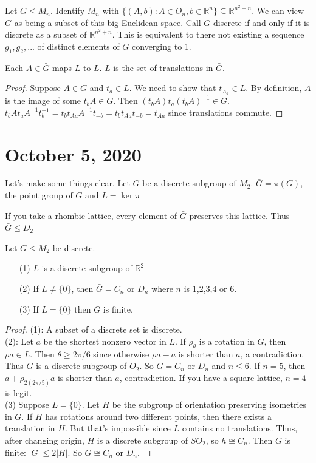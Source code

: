 \documentclass{article}
\newcommand{\R}{\mathbb{R}}
\begin{document}
\begin{definition}
Let $G\leq M_n$. Identify $M_n$ with $\{(A,b):A\in O_n, b\in\R^n\}\subseteq\R^{n^2+n}$. We can view $G$ as being a subset of this big Euclidean space. Call $G$ discrete if and only if it is discrete as a subset of $\R^{n^2+n}$. This is equivalent to there not existing a sequence $g_1,g_2,...$ of distinct elements of $G$ converging to 1.
\end{definition}
\begin{proposition}
Each $A\in\bar{G}$ maps $L$ to $L$. $L$ is the set of translations in $\bar{G}$.
\end{proposition}
\begin{proof}
Suppose $A\in\bar{G}$ and $t_a\in L$. We need to show that $t_{A_a}\in L$. By definition, $A$ is the image of some $t_bA\in G$. Then $(t_bA)t_a(t_bA)^{-1}\in G$. $t_bAt_aA^{-1}t^{-1}_b=t_bt_{Aa}A^{-1}t_{-b}=t_bt_{Aa}t_{-b}=t_{Aa}$ since translations commute.
\end{proof}
\section{October 5, 2020}
Let's make some things clear. Let $G$ be a discrete subgroup of $M_2$. $\bar{G}=\pi(G)$, the point group of $G$ and $L=\ker\pi$
\begin{example}
If you take a rhombic lattice, every element of $\bar{G}$ preserves this lattice. Thus $\bar{G}\leq D_2$
\end{example}
\begin{theorem}
Let $G\leq M_2$ be discrete.
\begin{enumerate}
    \item[(1)] $L$ is a discrete subgroup of $\R^2$
    \item[(2)] If $L\neq \{0\}$, then $\bar{G}=C_n$ or $D_n$ where $n$ is 1,2,3,4 or 6.
    \item[(3)] If $L=\{0\}$ then $G$ is finite.
\end{enumerate}
\end{theorem}
\begin{proof}
(1): A subset of a discrete set is discrete. \\
(2): Let $a$ be the shortest nonzero vector in $L$. If $\rho_\theta$ is a rotation in $\bar{G}$, then $\rho a\in L$. Then $\theta\geq 2\pi/6$ since otherwise $\rho a-a$ is shorter than $a$, a contradiction. Thus $\bar{G}$ is a discrete subgroup of $O_2$. So $\bar{G}=C_n$ or $D_n$ and $n\leq 6$. If $n=5$, then $a+\rho_{2(2\pi/5)}a$ is shorter than $a$, contradiction. If you have a square lattice, $n=4$ is legit. \\
(3) Suppose $L=\{0\}$. Let $H$ be the subgroup of orientation preserving isometries in $G$. If $H$ has rotations around two different points, then there exists a translation in $H$. But that's impossible since $L$ contains no translations. Thus, after changing origin, $H$ is a discrete subgroup of $SO_2$, so $h\cong C_n$. Then $G$ is finite: $|G|\leq 2|H|$. So $G\cong C_n$ or $D_n$.
\end{proof}
\end{document}
